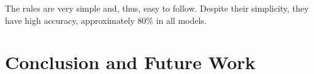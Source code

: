 The rules are very simple and, thus, easy to follow. Despite their simplicity,
they have high accuracy, approximately 80\% in all models.  

%


%
%

%
%
%
%
%
%
%

\section{Conclusion and Future Work}

